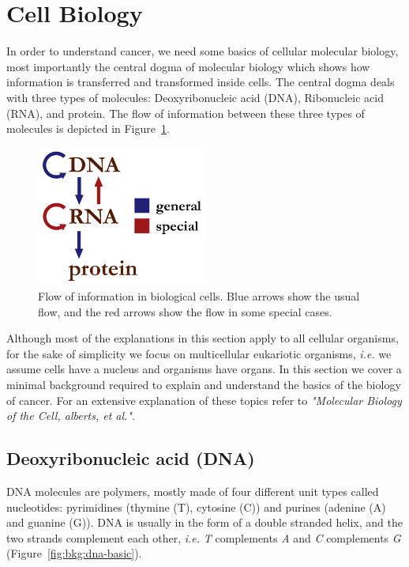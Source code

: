 \section{Cell Biology}
\label{sec:bkg:biology}
In order to understand cancer, we need some basics of cellular molecular biology, most importantly the central dogma of molecular biology which shows how information is transferred and transformed inside cells. The central dogma deals with three types of molecules: Deoxyribonucleic acid (DNA), Ribonucleic acid (RNA), and protein. The flow of information between these three types of molecules is depicted in Figure~\ref{fig:bkg:central-dogma}.

\begin{figure}[!ht]
  \centering
  \includegraphics[width=0.5\textwidth]{figs/background/Centraldogma_nodetails}
  \caption{Flow of information in biological cells. Blue arrows show the usual flow, and the red arrows show the flow in some special cases.}
  \label{fig:bkg:central-dogma}
\end{figure}

Although most of the explanations in this section apply to all cellular organisms, for the sake of simplicity we focus on multicellular eukariotic organisms, \emph{i.e.} we assume cells have a nucleus and organisms have organs. In this section we cover a minimal background required to explain and understand the basics of the biology of cancer. For an extensive explanation of these topics refer to \emph{"Molecular Biology of the Cell, alberts, et al."}\cite{the-cell}.

\subsection{Deoxyribonucleic acid (DNA)}
DNA molecules are polymers, mostly made of four different unit types called nucleotides: pyrimidines (thymine (T), cytosine (C)) and purines (adenine (A) and guanine (G)). DNA is usually in the form of a double stranded helix, and the two strands complement each other, \emph{i.e.} \emph{T} complements \emph{A} and \emph{C} complements \emph{G} (Figure~\ref{fig:bkg:dna-basic}).

